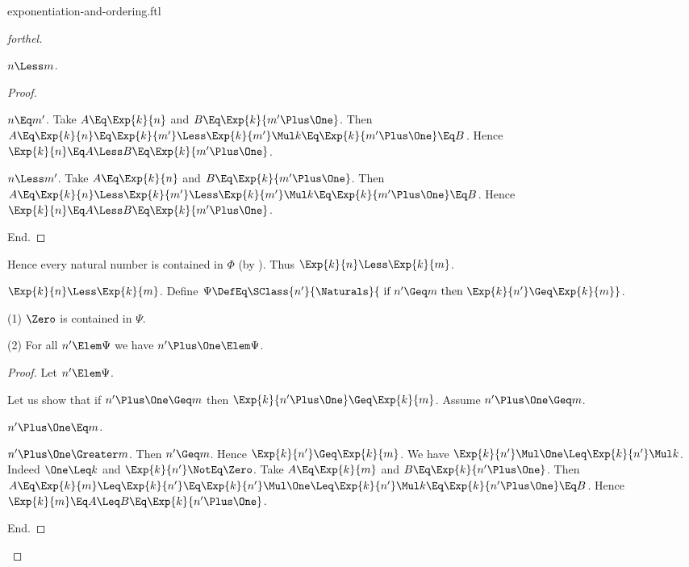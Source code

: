 \documentclass{stex}
\begin{document}
\begin{smodule}{exponentiation-and-ordering.ftl}
\begin{proof}[forthel]
\begin{case}{$n \Less m$.}
\begin{proof}
        \begin{case}{$n \Eq m'$.}
          Take $A \Eq \Exp{k}{n}$ and $B \Eq \Exp{k}{m' \Plus \One}$. %
          Then $A
            \Eq \Exp{k}{n}
            \Eq \Exp{k}{m'}
            \Less \Exp{k}{m'} \Mul k
            \Eq \Exp{k}{m' \Plus \One}
            \Eq B$.
          Hence $\Exp{k}{n} \Eq A \Less B \Eq \Exp{k}{m' \Plus \One}$.
        \end{case}

        \begin{case}{$n \Less m'$.}
          Take $A \Eq \Exp{k}{n}$ and $B \Eq \Exp{k}{m' \Plus \One}$. %
          Then $A
            \Eq \Exp{k}{n}
            \Less \Exp{k}{m'}
            \Less \Exp{k}{m'} \Mul k
            \Eq \Exp{k}{m' \Plus \One}
            \Eq B$.
          Hence $\Exp{k}{n} \Eq A \Less B \Eq \Exp{k}{m' \Plus \One}$.
        \end{case}
      End.
    \end{proof}

    Hence every natural number is contained in $\Phi$ (by ).
    Thus $\Exp{k}{n} \Less \Exp{k}{m}$.
  \end{case}

  \begin{case}{$\Exp{k}{n} \Less \Exp{k}{m}$.}
    Define $\Psi \DefEq \SClass{n'}{\Naturals}{\text{ if }n' \Geq m\text{ then }
    \Exp{k}{n'} \Geq \Exp{k}{m}}$.

    (1) $\Zero$ is contained in $\Psi$.

    (2) For all $n' \Elem \Psi$ we have $n' \Plus \One \Elem \Psi$.
    \begin{proof}
      Let $n' \Elem \Psi$.

      Let us show that if $n' \Plus \One \Geq m$ then $\Exp{k}{n' \Plus \One} \Geq \Exp{k}{m}$.
        Assume $n' \Plus \One \Geq m$.

        \begin{case}{$n' \Plus \One \Eq m$.} \end{case}

        \begin{case}{$n' \Plus \One \Greater m$.}
          Then $n' \Geq m$.
          Hence $\Exp{k}{n'} \Geq \Exp{k}{m}$.
          We have $\Exp{k}{n'} \Mul \One \Leq \Exp{k}{n'} \Mul k$.
          Indeed $\One \Leq k$ and $\Exp{k}{n'} \NotEq \Zero$.
          Take $A \Eq \Exp{k}{m}$ and $B \Eq \Exp{k}{n' \Plus \One}$. %
          Then $A
            \Eq \Exp{k}{m}
            \Leq \Exp{k}{n'}
            \Eq \Exp{k}{n'} \Mul \One
            \Leq \Exp{k}{n'} \Mul k
            \Eq \Exp{k}{n' \Plus \One}
            \Eq B$.
          Hence $\Exp{k}{m} \Eq A \Leq B \Eq \Exp{k}{n' \Plus \One}$.
        \end{case}
      End.
    \end{proof}


\end{case}
\end{proof}
\end{smodule}
\end{document}
